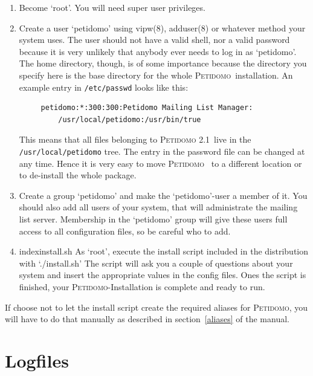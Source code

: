 \documentclass[a4paper]{report}
\newcommand{\Petidomo}{{\scshape Peti\-domo}}
\newcommand{\PetidomoTwo}{{\scshape Peti\-domo 2.1}}
\newcommand{\file}[1]{{\tt #1}}
\begin{document}
\begin{enumerate}

\item Become `root'. You will need super user privileges.

\item Create a user  `petidomo' using vipw(8),
     adduser(8) or whatever method your system uses. The user should
     not have a valid shell, nor a valid password because it is very
     unlikely that anybody ever needs to log in as `petidomo'. The
     home directory, though, is of some importance because the
     directory you specify here is the base directory for the whole
     \Petidomo\ installation. An example entry in \file{/etc/passwd}
     looks like this:

\begin{verbatim}
     petidomo:*:300:300:Petidomo Mailing List Manager:
         /usr/local/petidomo:/usr/bin/true
\end{verbatim}

     This means that all files belonging to \PetidomoTwo\ live in the
     \file{/usr/lo\-cal/pe\-ti\-domo} tree. The entry in the password file can be
     changed at any time. Hence it is very easy to move \Petidomo\
      to a different location or to de-install
     the whole package.

\item Create a group `petidomo' and make the `petidomo'-user a member of it.
     You should also add all users of your system, that will administrate
     the mailing list server. Membership in the `petidomo' group will give
     these users full access to all configuration files, so be careful who
     to add.

\item index{install.sh}  As `root', execute the
     install script included in the distribution with `./install.sh'
     The script will ask you a couple of questions about your system
     and insert the appropriate values in the config files. Ones the
     script is finished, your \Petidomo-Installation is complete and
     ready to run.

\end{enumerate}

If choose not to let the install script create the required aliases
for \Petidomo, you will have to do that manually as described in
section~\ref{aliases} of the manual.

\section{Logfiles}
\end{document}
